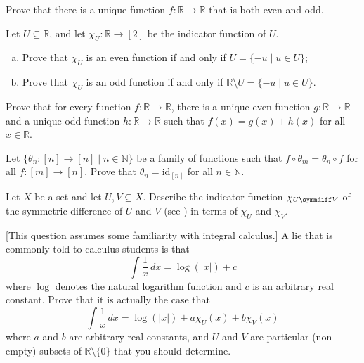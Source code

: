 \begin{chapex}
Prove that there is a unique function $f : \mathbb{R} \to \mathbb{R}$ that is both even and odd.
\end{chapex}

\begin{chapex}
Let $U \subseteq \mathbb{R}$, and let $\chi_U : \mathbb{R} \to [2]$ be the indicator function of $U$.
\begin{enumerate}[(a)]
\item Prove that $\chi_U$ is an even function if and only if $U = \{ -u \mid u \in U \}$;
\item Prove that $\chi_U$ is an odd function if and only if $\mathbb{R} \setminus U = \{ -u \mid u \in U \}$.
\end{enumerate}
\end{chapex}

\begin{chapex}
Prove that for every function $f : \mathbb{R} \to \mathbb{R}$, there is a unique even function $g : \mathbb{R} \to \mathbb{R}$ and a unique odd function $h : \mathbb{R} \to \mathbb{R}$ such that $f(x)=g(x)+h(x)$ for all $x \in \mathbb{R}$.
\end{chapex}

\begin{chapex}
Let $\{ \theta_n : [n] \to [n] \mid n \in \mathbb{N} \}$ be a family of functions such that $f \circ \theta_m = \theta_n \circ f$ for all $f : [m] \to [n]$. Prove that $\theta_n = \mathrm{id}_{[n]}$ for all $n \in \mathbb{N}$.
\end{chapex}

\begin{chapex}
Let $X$ be a set and let $U, V \subseteq X$. Describe the indicator function $\chi_{U \symmdiff V}$ of the symmetric difference of $U$ and $V$ (see ) in terms of $\chi_U$ and $\chi_V$.
\end{chapex}

\begin{chapex}
\label{cqAntiderivativeOfLogarithm}
[This question assumes some familiarity with 
integral calculus.] A lie that is commonly told to calculus students is that
\[ \int \dfrac{1}{x} \, dx = \log(|x|) + c \]
where $\log$ denotes the natural logarithm function and $c$ is an arbitrary real constant. Prove that it is actually the case that
\[ \int \dfrac{1}{x} \, dx = \log(|x|) + a \chi_U(x) + b \chi_V(x) \]
where $a$ and $b$ are arbitrary real constants, and $U$ and $V$ are particular (non-empty) subsets of $\mathbb{R} \setminus \{ 0 \}$ that you should determine.
\end{chapex}

